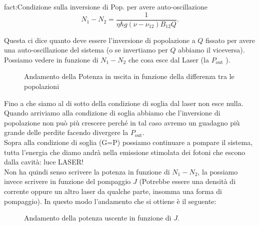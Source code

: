 \begin{fact}{fact:Condizione sulla inversione di Pop. per avere auto-oscillazione}
\[
    N_1-N_2 = \frac{1}{\eta\hbar  g(\nu-\nu_{12})B_{12}Q}
.\]
\end{fact}
Questa ci dice quanto deve essere l'inversione di popolazione a $Q$ fissato per avere una auto-oscillazione del sistema (o se invertiamo per $Q$ abbiamo il viceversa).\\
Possiamo vedere in funzione di $N_1-N_2$ che cosa esce dal Laser (la $P_\text{out}$ ).
\begin{figure}[H]
    \centering
    \caption{Andamento della Potenza in uscita in funzione della differenza tra le popolazioni}
    \label{fig:andamento-della-potenza-in-uscita-in-funzione-della-differenza-tra-le-popolazioni}
\end{figure}
\noindent
Fino a che siamo al di sotto della condizione di soglia dal laser non esce nulla. Quando arriviamo alla condizione di soglia abbiamo che l'inversione di popolazione non può più crescere perché in tal caso avremo un guadagno più grande delle perdite facendo divergere la $P_\text{out}$.\\
Sopra alla condizione di soglia (G=P) possiamo continuare a pompare il sistema, tutta l'energia che diamo andrà nella emissione stimolata dei fotoni che escono dalla cavità: luce LASER!\\
Non ha quindi senso scrivere la potenza in funzione di $N_1-N_2$, la possiamo invece scrivere in funzione del pompaggio $J$ (Potrebbe essere una densità di corrente oppure un altro laser da qualche parte, insomma una forma di pompaggio). In questo modo l'andamento che si ottiene è il seguente:
\begin{figure}[H]
    \centering
    \caption{Andamento della potenza uscente in funzione di $J$.}
    \label{Pompaggio}
\end{figure}
